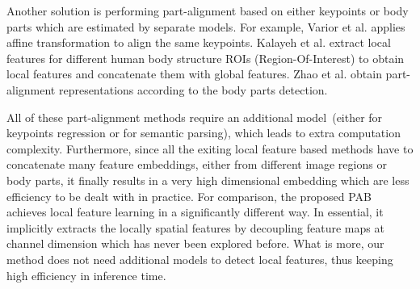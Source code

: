 \documentclass[10pt,twocolumn,letterpaper]{article}
\begin{document}
Another solution is performing part-alignment based on either keypoints or body parts which are estimated by separate models. For example, Varior et al. \cite{varior2016siamese} applies affine transformation to align the same keypoints. Kalayeh et al. \cite{kalayeh2018human} extract local features for different human body structure ROIs (Region-Of-Interest) to obtain local features and concatenate them with global features. Zhao et al. \cite{zhao2017deeply} obtain part-alignment representations according to the body parts detection. 

All of these part-alignment methods require an additional model~(either for keypoints regression or for semantic parsing), which leads to extra computation complexity. Furthermore, since all the exiting local feature based methods have to concatenate many feature embeddings, either from different image regions or body parts, it finally results in a very high dimensional embedding which are less efficiency to be dealt with in practice. For comparison, the proposed PAB achieves local feature learning in a significantly different way. In essential, it implicitly extracts the locally spatial features by decoupling feature maps at channel dimension which has never been explored before. What is more, our method does not need additional models to detect local features, thus keeping high efficiency in inference time.
\end{document}

